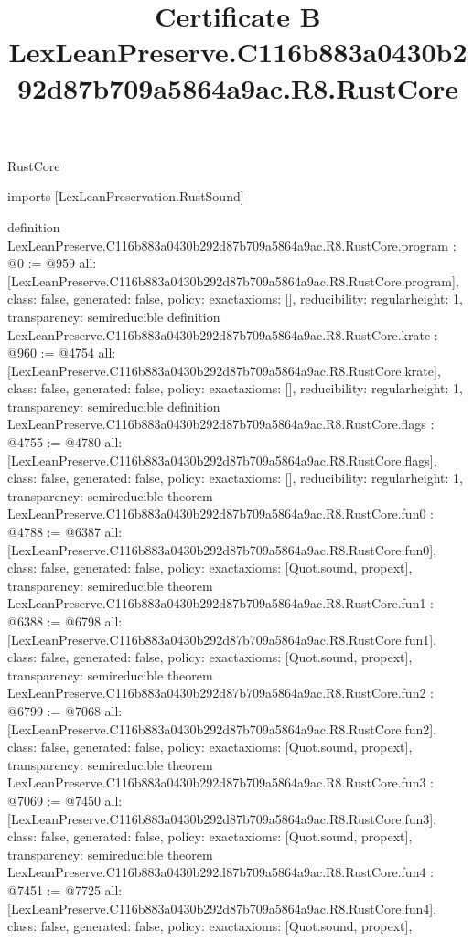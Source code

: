 \begin{lexlean}{RustCore}
\title{Certificate B LexLeanPreserve.C116b883a0430b292d87b709a5864a9ac.R8.RustCore}
\begin{coremodule}
imports [LexLeanPreservation.RustSound]

definition LexLeanPreserve.C116b883a0430b292d87b709a5864a9ac.R8.RustCore.program : @0 := @959 {
  all: [LexLeanPreserve.C116b883a0430b292d87b709a5864a9ac.R8.RustCore.program],
  class: false,
  generated: false,
  policy: exact{axioms: []},
  reducibility: regular{height: 1},
  transparency: semireducible
}
definition LexLeanPreserve.C116b883a0430b292d87b709a5864a9ac.R8.RustCore.krate : @960 := @4754 {
  all: [LexLeanPreserve.C116b883a0430b292d87b709a5864a9ac.R8.RustCore.krate],
  class: false,
  generated: false,
  policy: exact{axioms: []},
  reducibility: regular{height: 1},
  transparency: semireducible
}
definition LexLeanPreserve.C116b883a0430b292d87b709a5864a9ac.R8.RustCore.flags : @4755 := @4780 {
  all: [LexLeanPreserve.C116b883a0430b292d87b709a5864a9ac.R8.RustCore.flags],
  class: false,
  generated: false,
  policy: exact{axioms: []},
  reducibility: regular{height: 1},
  transparency: semireducible
}
theorem LexLeanPreserve.C116b883a0430b292d87b709a5864a9ac.R8.RustCore.fun0 : @4788 := @6387 {
  all: [LexLeanPreserve.C116b883a0430b292d87b709a5864a9ac.R8.RustCore.fun0],
  class: false,
  generated: false,
  policy: exact{axioms: [Quot.sound, propext]},
  transparency: semireducible
}
theorem LexLeanPreserve.C116b883a0430b292d87b709a5864a9ac.R8.RustCore.fun1 : @6388 := @6798 {
  all: [LexLeanPreserve.C116b883a0430b292d87b709a5864a9ac.R8.RustCore.fun1],
  class: false,
  generated: false,
  policy: exact{axioms: [Quot.sound, propext]},
  transparency: semireducible
}
theorem LexLeanPreserve.C116b883a0430b292d87b709a5864a9ac.R8.RustCore.fun2 : @6799 := @7068 {
  all: [LexLeanPreserve.C116b883a0430b292d87b709a5864a9ac.R8.RustCore.fun2],
  class: false,
  generated: false,
  policy: exact{axioms: [Quot.sound, propext]},
  transparency: semireducible
}
theorem LexLeanPreserve.C116b883a0430b292d87b709a5864a9ac.R8.RustCore.fun3 : @7069 := @7450 {
  all: [LexLeanPreserve.C116b883a0430b292d87b709a5864a9ac.R8.RustCore.fun3],
  class: false,
  generated: false,
  policy: exact{axioms: [Quot.sound, propext]},
  transparency: semireducible
}
theorem LexLeanPreserve.C116b883a0430b292d87b709a5864a9ac.R8.RustCore.fun4 : @7451 := @7725 {
  all: [LexLeanPreserve.C116b883a0430b292d87b709a5864a9ac.R8.RustCore.fun4],
  class: false,
  generated: false,
  policy: exact{axioms: [Quot.sound, propext]},
}
\end{coremodule}
\end{lexlean}
